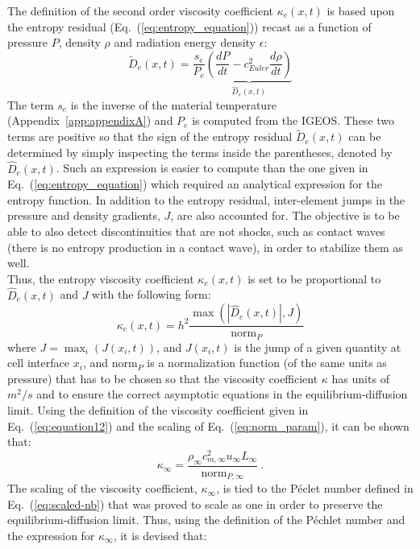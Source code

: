 \documentclass[review]{elsarticle}
\newcommand{\eqt}[1]{Eq.~(\ref{#1})}                     %
\newcommand{\app}[1]{Appendix~\ref{#1}}                     %
\newcommand{\norm}{\textrm{norm}}
\begin{document}
\noindent 
The definition of the second order viscosity coefficient $\kappa_e(x,t)$ is based upon the entropy residual (\eqt{eq:entropy_equation}) recast as a function of pressure $P$, density $\rho$ and radiation energy density $\epsilon$:
\begin{equation}
\label{eq:equation9}
\tilde{D}_e(x,t) = \frac{s_e}{P_e} \underbrace{ \left( \frac{dP}{dt} - c_{Euler}^2 \frac{d\rho}{dt} \right)}_\textrm{$\hat{D}_e(x,t)$}
\end{equation}
The term $s_e$ is the inverse of the material temperature (\app{app:appendixA}) and $P_e$ is computed from the IGEOS. These two terms are positive so that the sign of the entropy residual $\tilde{D}_e(x,t)$ can be determined by simply inspecting the terms inside the parentheses, denoted by $\hat{D}_e(x,t)$. Such an expression is easier to compute than the one given in \eqt{eq:entropy_equation} which required an analytical expression for the entropy function. In addition to the entropy residual, inter-element jumps in the pressure and density gradients, $J$, are also accounted for. The objective is to be able to also detect discontinuities that are not shocks, such as contact waves (there is no entropy production in a contact wave), in order to stabilize them as well. \\
Thus, the entropy viscosity coefficient $\kappa_e(x,t)$ is set to be proportional to $\hat{D}_e(x,t)$ and $J$ with the following form: 
\begin{equation}
\label{eq:equation12}
\kappa_e(x,t) = h^2 \frac{\max (|\hat{D}_e(x,t)|, J)}{\norm_P}
\end{equation} 
where $J = \max_i (J(x_i,t))$, and $J(x_i,t)$ is the jump of a given quantity at cell interface $x_i$, and $\norm_P$ is a normalization function (of the same units as pressure) that has to be chosen so that the viscosity coefficient $\kappa$ has units of $m^2/s$ and to ensure the correct asymptotic equations in the equilibrium-diffusion limit. Using the definition of the viscosity coefficient given in \eqt{eq:equation12} and the scaling of \eqt{eq:norm_param}, it can be shown that:
%
\begin{equation}
\kappa_\infty = \frac{\rho_\infty c^2_{m,\infty} u_\infty L_\infty}{\norm_{P,\infty}} \ .
\end{equation}
%
The scaling of the viscosity coefficient, $\kappa_\infty$, is tied to the P\'eclet number defined in \eqt{eq:scaled-nb} that was proved to scale as one in order to preserve the equilibrium-diffusion limit. Thus, using the definition of the P\'echlet number and the expression for $\kappa_\infty$, it is devised that:
\end{document}

